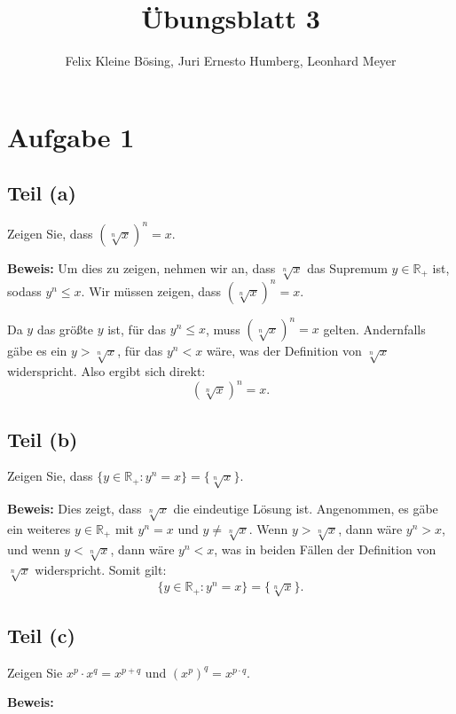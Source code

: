 \documentclass[11pt]{article}
\begin{document}
\title{Übungsblatt 3}
\author{Felix Kleine Bösing, Juri Ernesto Humberg, Leonhard Meyer}
\maketitle

\section*{Aufgabe 1}

\subsection*{Teil (a)}

Zeigen Sie, dass \( \left( \sqrt[n]{x} \right)^n = x \).

\textbf{Beweis:} Um dies zu zeigen, nehmen wir an, dass \( \sqrt[n]{x} \) das Supremum \( y \in \mathbb{R}_+ \) ist, sodass \( y^n \leq x \). Wir müssen zeigen, dass \( \left( \sqrt[n]{x} \right)^n = x \).

Da \( y \) das größte \( y \) ist, für das \( y^n \leq x \), muss \( \left( \sqrt[n]{x} \right)^n = x \) gelten. Andernfalls gäbe es ein \( y > \sqrt[n]{x} \), für das \( y^n < x \) wäre, was der Definition von \( \sqrt[n]{x} \) widerspricht. Also ergibt sich direkt:
\[
\left( \sqrt[n]{x} \right)^n = x.
\]

\subsection*{Teil (b)}

Zeigen Sie, dass \( \{ y \in \mathbb{R}_+ : y^n = x \} = \{ \sqrt[n]{x} \} \).

\textbf{Beweis:} Dies zeigt, dass \( \sqrt[n]{x} \) die eindeutige Lösung ist. Angenommen, es gäbe ein weiteres \( y \in \mathbb{R}_+ \) mit \( y^n = x \) und \( y \neq \sqrt[n]{x} \). Wenn \( y > \sqrt[n]{x} \), dann wäre \( y^n > x \), und wenn \( y < \sqrt[n]{x} \), dann wäre \( y^n < x \), was in beiden Fällen der Definition von \( \sqrt[n]{x} \) widerspricht. Somit gilt:
\[
\{ y \in \mathbb{R}_+ : y^n = x \} = \{ \sqrt[n]{x} \}.
\]

\subsection*{Teil (c)}
Zeigen Sie \( x^p \cdot x^q = x^{p+q} \) und \( (x^p)^q = x^{p \cdot q} \).

\textbf{Beweis:}
\end{document}
